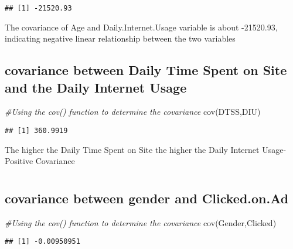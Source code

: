 \documentclass[
]{article}
\newenvironment{Shaded}{\begin{snugshade}}{\end{snugshade}}
\newcommand{\CommentTok}[1]{\textcolor[rgb]{0.56,0.35,0.01}{\textit{#1}}}
\newcommand{\FunctionTok}[1]{\textcolor[rgb]{0.00,0.00,0.00}{#1}}
\newcommand{\NormalTok}[1]{#1}
\begin{document}
\begin{verbatim}
## [1] -21520.93
\end{verbatim}

The covariance of Age and Daily.Internet.Usage variable is about
-21520.93, indicating negative linear relationship between the two
variables

\hypertarget{covariance-between-daily-time-spent-on-site-and-the-daily-internet-usage}{%
\subsection{covariance between Daily Time Spent on Site and the Daily
Internet
Usage}\label{covariance-between-daily-time-spent-on-site-and-the-daily-internet-usage}}

\begin{Shaded}
\begin{Highlighting}[]
\CommentTok{\#Using the cov() function to determine the covariance}
\FunctionTok{cov}\NormalTok{(DTSS,DIU)}
\end{Highlighting}
\end{Shaded}

\begin{verbatim}
## [1] 360.9919
\end{verbatim}

The higher the Daily Time Spent on Site the higher the Daily Internet
Usage-Positive Covariance

\hypertarget{section-3}{%
\section{}\label{section-3}}

\hypertarget{covariance-between-gender-and-clicked.on.ad}{%
\subsection{covariance between gender and
Clicked.on.Ad}\label{covariance-between-gender-and-clicked.on.ad}}

\begin{Shaded}
\begin{Highlighting}[]
\CommentTok{\#Using the cov() function to determine the covariance}
\FunctionTok{cov}\NormalTok{(Gender,Clicked)}
\end{Highlighting}
\end{Shaded}

\begin{verbatim}
## [1] -0.00950951
\end{verbatim}
\end{document}
